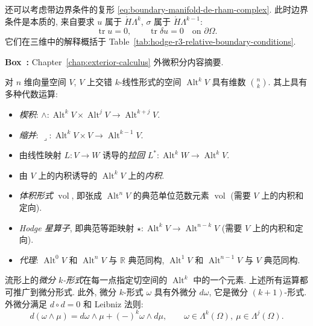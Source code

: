 {还可以考虑带边界条件的复形 \eqref{eq:boundary-manifold-de-rham-complex}. 此时边界条件是本质的, 来自要求 $u$ 属于 $\mathring H\Lambda^k$, $\sigma$ 属于 $\mathring H\Lambda^{k-1}$:}
\[
\operatorname{tr}u=0,\qquad\operatorname{tr}\delta u=0\quad\text{on }\partial\Omega.
\]
{它们在三维中的解释概括于 Table~\ref{tab:hodge-r3-relative-boundary-conditions}.}


\begin{MBSourceBox}
\label{box:exterior-calculus-summary}
\noindent\textbf{Box~\thebooksummary:} {Chapter~\ref{chap:exterior-calculus} 外微积分内容摘要.}\par

{对 $n$ 维向量空间 $V$, $V$ 上交错 $k$-线性形式的空间 $\operatorname{Alt}^kV$ 具有维数 $\binom nk$. 其上具有多种代数运算:}
\begin{itemize}
\item{\emph{楔积}: $\wedge:\operatorname{Alt}^kV\times\operatorname{Alt}^jV\to\operatorname{Alt}^{k+j}V$.}
\item{\emph{缩并}: $\lrcorner:\operatorname{Alt}^kV\times V\to\operatorname{Alt}^{k-1}V$.}
\item{由线性映射 $L:V\to W$ 诱导的\emph{拉回} $L^*:\operatorname{Alt}^kW\to\operatorname{Alt}^kV$.}
\item{由 $V$ 上的内积诱导的 $\operatorname{Alt}^kV$ 上的\emph{内积}.}
\item{\emph{体积形式} $\operatorname{vol}$, 即张成 $\operatorname{Alt}^nV$ 的典范单位范数元素 $\operatorname{vol}$ (需要 $V$ 上的内积和定向).}
\item{\emph{Hodge 星算子}, 即典范等距映射 $\star:\operatorname{Alt}^kV\to\operatorname{Alt}^{n-k}V$ (需要 $V$ 上的内积和定向).}
\item{\emph{代理}: $\operatorname{Alt}^0V$ 和 $\operatorname{Alt}^nV$ 与 $\mathbb R$ 典范同构, $\operatorname{Alt}^1V$ 和 $\operatorname{Alt}^{n-1}V$ 与 $V$ 典范同构.}
\end{itemize}

{流形上的\emph{微分 $k$-形式}在每一点指定切空间的 $\operatorname{Alt}^k$ 中的一个元素. 上述所有运算都可推广到微分形式. 此外, 微分 $k$-形式 $\omega$ 具有外微分 $d\omega$, 它是微分 $(k+1)$-形式. 外微分满足 $d\circ d=0$ 和 Leibniz 法则:}
\[
d(\omega\wedge\mu)=d\omega\wedge\mu+(-)^k\omega\wedge d\mu,\qquad\omega\in\Lambda^k(\Omega),\ \mu\in\Lambda^j(\Omega).
\]


\end{MBSourceBox}
